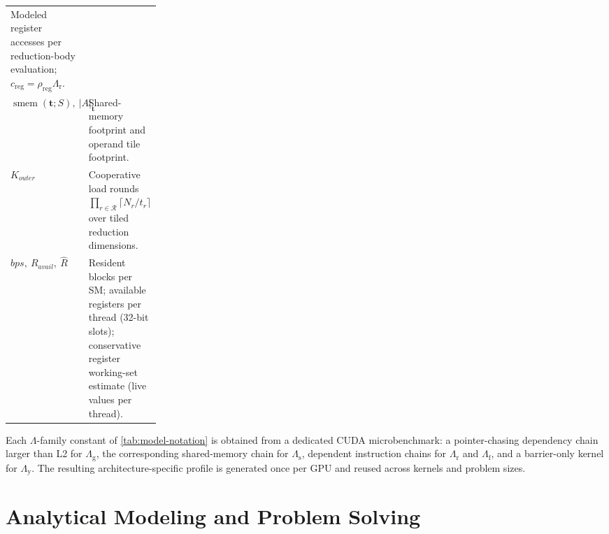 \documentclass[acmsmall,review,anonymous,screen]{acmart}
\newif\ifrevmarkup %
\DeclareRobustCommand{\revRthree}[1]{\ifrevmarkup{\color{revRthree}\hypersetup{allcolors=revRthree}#1}\else#1\fi} %
\newcommand{\tile}{t}
\newcommand{\tvec}{\mathbf{t}}
\newcommand{\Lg}{\Lambda_{\mathrm g}}
\newcommand{\Ls}{\Lambda_{\mathrm s}}
\newcommand{\Lr}{\Lambda_{\mathrm r}}
\newcommand{\Lf}{\Lambda_{\mathrm f}}
\newcommand{\Ly}{\Lambda_{\mathrm y}}
\newcommand{\creg}{c_{\mathrm{reg}}}
\providecommand{\DIFaddbeginFL}{} %
\providecommand{\DIFaddendFL}{} %
\newcommand{\DIFaddincludegraphics}[2][]{{\color{blue}\fbox{\DIFOincludegraphics[#1]{#2}}}} %
\DeclareRobustCommand{\DIFaddbeginFL}{\DIFOaddbeginFL \let\includegraphics\DIFaddincludegraphics} %
\DeclareRobustCommand{\DIFaddendFL}{\DIFOaddendFL \let\includegraphics\DIFOincludegraphics} %
\begin{document}
\begin{table}[tbp]
\begin{tabularx}{0.9\textwidth}{@{}
    >{\raggedright\arraybackslash}p{0.25\linewidth}
    >{\raggedright\arraybackslash}X
    @{}}
      Modeled register accesses per reduction-body evaluation;
      \(\creg=\rho_{\mathrm{reg}}\Lr\). \\
    \(\operatorname{smem}(\tvec;S),\ |A|_{\tvec}\) &
      Shared-memory footprint and operand tile footprint. \\
    \(K_{\mathit{outer}}\) &
      Cooperative load rounds \(\prod_{r\in\mathcal{R}}\lceil N_r/\tile_r\rceil\)
      over tiled reduction dimensions. \\
    \(bps,\ R_{\mathit{avail}},\ \hat{R}\) &
      Resident blocks per SM; available registers per thread \DIFaddbeginFL \revRthree{(32-bit slots)}\DIFaddendFL ;
      conservative register working-set estimate \DIFaddbeginFL \revRthree{(live values per thread)}\DIFaddendFL . \\
    \bottomrule
  \end{tabularx}
\end{table}

Each \(\Lambda\)-family constant of \autoref{tab:model-notation} is obtained from a dedicated CUDA microbenchmark: a pointer-chasing dependency chain larger than L2 for \(\Lg\), the corresponding shared-memory chain for \(\Ls\), dependent instruction chains for \(\Lr\) and \(\Lf\), and a barrier-only kernel for \(\Ly\). The resulting architecture-specific profile is generated once per GPU and reused across kernels and problem sizes.

\section{Analytical Modeling and Problem Solving}
\label{sec:model}
\end{document}
